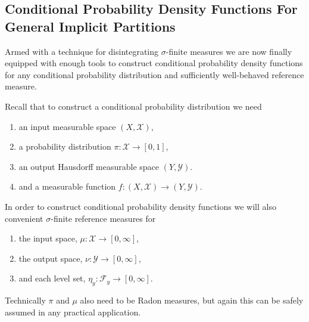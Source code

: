 \documentclass[
  letterpaper,
  DIV=11,
  numbers=noendperiod]{scrartcl}
\providecommand{\tightlist}{%
  \setlength{\itemsep}{0pt}\setlength{\parskip}{0pt}}\usepackage{longtable,booktabs,array}
\begin{document}
\subsection{Conditional Probability Density Functions For General
Implicit
Partitions}\label{conditional-probability-density-functions-for-general-implicit-partitions}

Armed with a technique for disintegrating \(\sigma\)-finite measures we
are now finally equipped with enough tools to construct conditional
probability density functions for any conditional probability
distribution and sufficiently well-behaved reference measure.

Recall that to construct a conditional probability distribution we need

\begin{enumerate}
\def\labelenumi{\arabic{enumi}.}
\tightlist
\item
  an input measurable space \((X, \mathcal{X})\),
\item
  a probability distribution \(\pi : \mathcal{X} \rightarrow [0, 1]\),
\item
  an output Hausdorff measurable space \((Y, \mathcal{Y})\).
\item
  and a measurable function
  \(f: (X, \mathcal{X}) \rightarrow (Y, \mathcal{Y})\).
\end{enumerate}

In order to construct conditional probability density functions we will
also convenient \(\sigma\)-finite reference measures for

\begin{enumerate}
\def\labelenumi{\arabic{enumi}.}
\setcounter{enumi}{4}
\tightlist
\item
  the input space, \(\mu : \mathcal{X} \rightarrow [0, \infty]\),
\item
  the output space, \(\nu : \mathcal{Y} \rightarrow [0, \infty]\),
\item
  and each level set,
  \(\eta_{y} : \mathcal{F}_{y} \rightarrow [0, \infty]\).
\end{enumerate}

Technically \(\pi\) and \(\mu\) also need to be Radon measures, but
again this can be safely assumed in any practical application.
\end{document}
